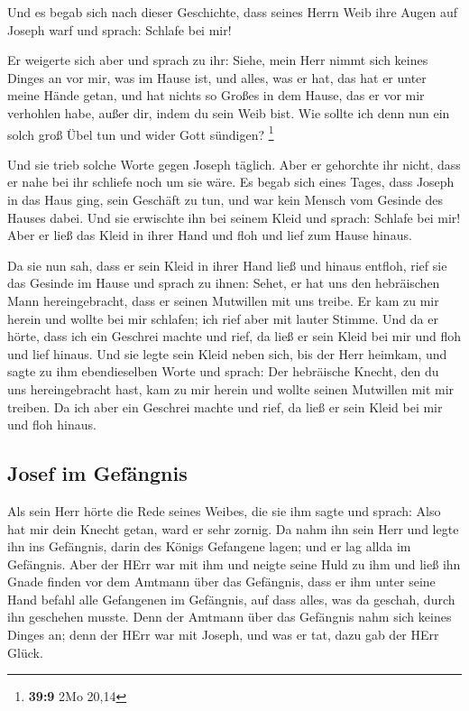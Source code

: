  Und es begab sich nach dieser Geschichte, dass seines
Herrn Weib ihre Augen auf Joseph warf und sprach: Schlafe bei mir!

 Er weigerte sich aber und sprach zu ihr: Siehe, mein Herr
nimmt sich keines Dinges an vor mir, was im Hause ist, und alles, was er
hat, das hat er unter meine Hände getan,  und hat nichts
so Großes in dem Hause, das er vor mir verhohlen habe, außer dir, indem
du sein Weib bist. Wie sollte ich denn nun ein solch groß Übel tun und
wider Gott sündigen? \footnote{\textbf{39:9} 2Mo 20,14}

 Und sie trieb solche Worte gegen Joseph täglich. Aber er
gehorchte ihr nicht, dass er nahe bei ihr schliefe noch um sie wäre.
 Es begab sich eines Tages, dass Joseph in das Haus ging,
sein Geschäft zu tun, und war kein Mensch vom Gesinde des Hauses dabei.
 Und sie erwischte ihn bei seinem Kleid und sprach:
Schlafe bei mir! Aber er ließ das Kleid in ihrer Hand und floh und lief
zum Hause hinaus.

 Da sie nun sah, dass er sein Kleid in ihrer Hand ließ
und hinaus entfloh,  rief sie das Gesinde im Hause und
sprach zu ihnen: Sehet, er hat uns den hebräischen Mann hereingebracht,
dass er seinen Mutwillen mit uns treibe. Er kam zu mir herein und wollte
bei mir schlafen; ich rief aber mit lauter Stimme.  Und
da er hörte, dass ich ein Geschrei machte und rief, da ließ er sein
Kleid bei mir und floh und lief hinaus.  Und sie legte
sein Kleid neben sich, bis der Herr heimkam,  und sagte
zu ihm ebendieselben Worte und sprach: Der hebräische Knecht, den du uns
hereingebracht hast, kam zu mir herein und wollte seinen Mutwillen mit
mir treiben.  Da ich aber ein Geschrei machte und rief,
da ließ er sein Kleid bei mir und floh hinaus.

\hypertarget{josef-im-gefuxe4ngnis}{%
\subsection{Josef im Gefängnis}\label{josef-im-gefuxe4ngnis}}

 Als sein Herr hörte die Rede seines Weibes, die sie ihm
sagte und sprach: Also hat mir dein Knecht getan, ward er sehr zornig.
 Da nahm ihn sein Herr und legte ihn ins Gefängnis, darin
des Königs Gefangene lagen; und er lag allda im Gefängnis.
 Aber der HErr war mit ihm und neigte seine Huld zu ihm
und ließ ihn Gnade finden vor dem Amtmann über das Gefängnis,
 dass er ihm unter seine Hand befahl alle Gefangenen im
Gefängnis, auf dass alles, was da geschah, durch ihn geschehen musste.
 Denn der Amtmann über das Gefängnis nahm sich keines
Dinges an; denn der HErr war mit Joseph, und was er tat, dazu gab der
HErr Glück.


